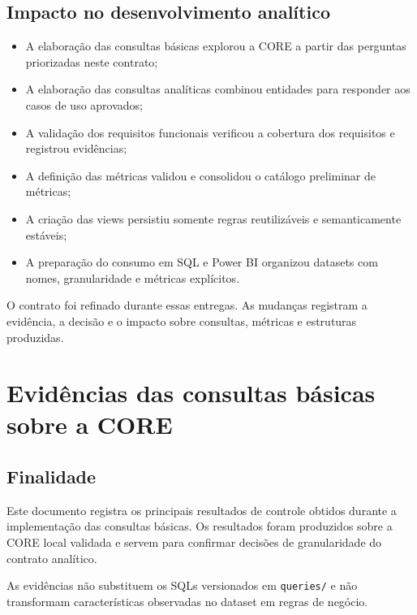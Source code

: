 \documentclass[12pt,a4paper]{article}
\providecommand{\tightlist}{
  \setlength{\itemsep}{0pt}\setlength{\parskip}{0pt}
}
\begin{document}
\subsection{Impacto no desenvolvimento
analítico}\label{docs__analytics__contrato_analitico.md__impacto-no-fluxo-m06}

\begin{itemize}
\tightlist
\item
  A elaboração das consultas básicas explorou a CORE a partir das perguntas priorizadas neste
  contrato;
\item
  A elaboração das consultas analíticas combinou entidades para responder aos casos de uso aprovados;
\item
  A validação dos requisitos funcionais verificou a cobertura dos requisitos e registrou evidências;
\item
  A definição das métricas validou e consolidou o catálogo preliminar de métricas;
\item
  A criação das views persistiu somente regras reutilizáveis e semanticamente
  estáveis;
\item
  A preparação do consumo em SQL e Power BI organizou datasets com nomes, granularidade e métricas
  explícitos.
\end{itemize}

O contrato foi refinado durante essas entregas. As mudanças registram a
evidência, a decisão e o impacto sobre consultas, métricas e estruturas
produzidas.

\section{Evidências das consultas básicas sobre a
CORE}\label{docs__analytics__evidencias_consultas_basicas_core.md__eviduxeancias-das-consultas-buxe1sicas-sobre-a-core}

\subsection{Finalidade}\label{docs__analytics__evidencias_consultas_basicas_core.md__finalidade}

Este documento registra os principais resultados de controle obtidos
durante a implementação das consultas básicas. Os
resultados foram produzidos sobre a CORE local validada e servem para
confirmar decisões de granularidade do contrato analítico.

As evidências não substituem os SQLs versionados em \nolinkurl{queries/}
e não transformam características observadas no dataset em regras de
negócio.
\end{document}
